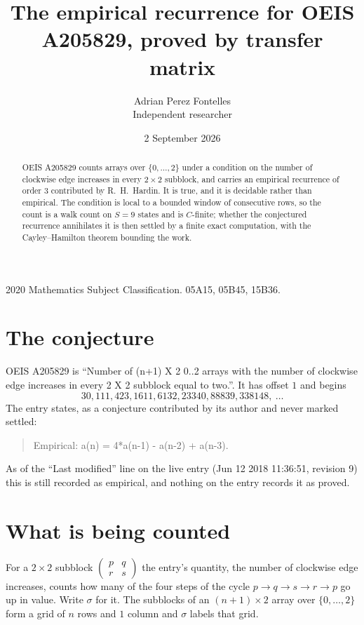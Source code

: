 \documentclass[11pt,a4paper]{article}
\title{The empirical recurrence for OEIS A205829, proved by transfer matrix}
\author{Adrian Perez Fontelles\\ \small Independent researcher}
\date{2 September 2026}
\theoremstyle{plain}
\theoremstyle{definition}
\begin{document}
\maketitle

\begin{abstract}
OEIS A205829 counts arrays over $\{0,\dots,2\}$ under a condition on the number of clockwise edge increases
in every $2\times2$ subblock, and carries an empirical recurrence of order $3$ contributed by
R.~H.~Hardin. It is true, and it is decidable rather than empirical. The condition is local to
a bounded window of consecutive rows, so the count is a walk count on $S=9$ states and is
$C$-finite; whether the conjectured recurrence annihilates it is then settled by a finite exact
computation, with the Cayley--Hamilton theorem bounding the work.
\end{abstract}

\noindent\small 2020 Mathematics Subject Classification. 05A15, 05B45, 15B36.\normalsize

\section{The conjecture}

OEIS A205829 is ``Number of (n+1) X 2 0..2 arrays with the number of clockwise edge increases in every 2 X 2 subblock equal to two.''. It has offset $1$ and begins
\[
30, 111, 423, 1611, 6132, 23340, 88839, 338148,\ \dots
\]
The entry states, as a conjecture contributed by its author and never marked settled:
\begin{quote}
Empirical: a(n) = 4*a(n-1) - a(n-2) + a(n-3).
\end{quote}
As of the ``Last modified'' line on the live entry (Jun 12 2018 11:36:51, revision 9) this is still
recorded as empirical, and nothing on the entry records it as proved.

\section{What is being counted}

For a $2\times2$ subblock $\begin{pmatrix}p&q\\r&s\end{pmatrix}$ the
entry's quantity, the number of clockwise edge increases, counts how many of the four steps of the cycle $p\to q\to s\to r\to p$ go up in value. Write $\sigma$ for it. The subblocks of an
$(n+1)\times2$ array over $\{0,\dots,2\}$ form a grid of $n$ rows and $1$
column and $\sigma$ labels that grid.
\end{document}
